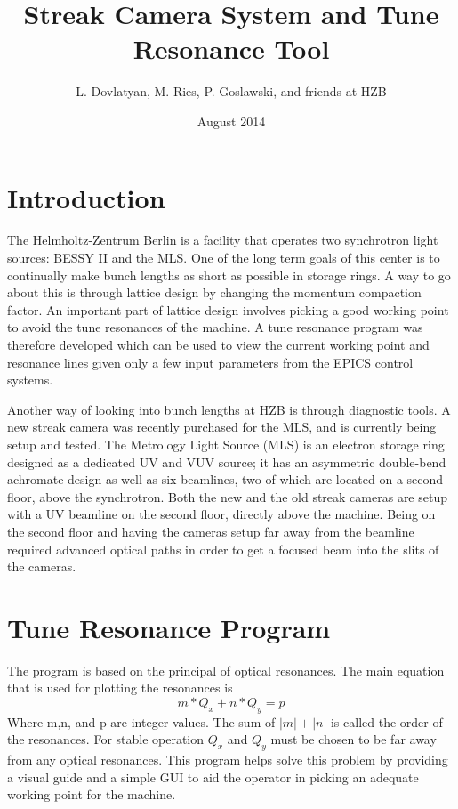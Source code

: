 \documentclass[%
 reprint,%
 amssymb, amsmath,%
 aip,cha,%
]{revtex4-1}
\begin{document}
\title{Streak Camera System and Tune Resonance Tool}%

\author{L. Dovlatyan, M. Ries, P. Goslawski, and friends at HZB}%
%

\date{August 2014}%

\maketitle

\tableofcontents

\section{Introduction}

The Helmholtz-Zentrum Berlin is a facility that operates two synchrotron light sources: BESSY II and the MLS. One of the long term goals of this center is to continually make bunch lengths as short as possible in storage rings. A way to go about this is through lattice design by changing the momentum compaction factor. An important part of lattice design involves picking a good working point to avoid the tune resonances of the machine. A tune resonance program was therefore developed which can be used to view the current working point and resonance lines given only a few input parameters from the EPICS control systems.

Another way of looking into bunch lengths at HZB is through diagnostic tools. A new streak camera was recently purchased for the MLS, and is currently being setup and tested. The Metrology Light Source (MLS) is an electron storage ring designed as a dedicated UV and VUV source; it has an asymmetric double-bend achromate design as well as six beamlines, two of which are located on a second floor, above the synchrotron. Both the new and the old streak cameras are setup with a UV beamline on the second floor, directly above the machine. Being on the second floor and having the cameras setup far away from the beamline required advanced optical paths in order to get a focused beam into the slits of the cameras.

\section{Tune Resonance Program\cite{Note1}}

The program is based on the principal of optical resonances. The main equation that is used for plotting the resonances is
\begin{equation}
 m*Q_x + n*Q_y = p
\end{equation}
Where m,n, and p are integer values. The sum of $ |m| + |n| $ is called the order of the resonances. For stable operation $Q_x$ and $Q_y$ must be chosen to be far away from any optical resonances. This program helps solve this problem by providing a visual guide and a simple GUI to aid the operator in picking an adequate working point for the machine.
\end{document}
